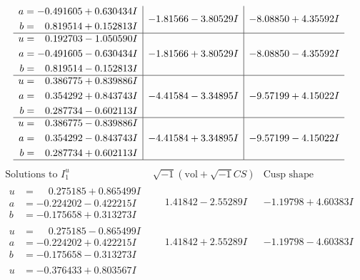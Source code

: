\documentclass[1p]{elsarticle_modified}
\theoremstyle{definition}
\newcommand{\I}{\sqrt{-1}}
\begin{document}
$$\begin{array}{c|c|c}
\begin{aligned}
a &= -0.491605 + 0.630434 I \\
b &= \phantom{-}0.819514 + 0.152813 I\end{aligned}
 & -1.81566 - 3.80529 I & -8.08850 + 4.35592 I \\ \hline\begin{aligned}
u &= \phantom{-}0.192703 - 1.050590 I \\
a &= -0.491605 - 0.630434 I \\
b &= \phantom{-}0.819514 - 0.152813 I\end{aligned}
 & -1.81566 + 3.80529 I & -8.08850 - 4.35592 I \\ \hline\begin{aligned}
u &= \phantom{-}0.386775 + 0.839886 I \\
a &= \phantom{-}0.354292 + 0.843743 I \\
b &= \phantom{-}0.287734 - 0.602113 I\end{aligned}
 & -4.41584 - 3.34895 I & -9.57199 + 4.15022 I \\ \hline\begin{aligned}
u &= \phantom{-}0.386775 - 0.839886 I \\
a &= \phantom{-}0.354292 - 0.843743 I \\
b &= \phantom{-}0.287734 + 0.602113 I\end{aligned}
 & -4.41584 + 3.34895 I & -9.57199 - 4.15022 I\\
 \hline 
 \end{array}$$\newpage$$\begin{array}{c|c|c}  
\text{Solutions to }I^u_{1}& \I (\text{vol} + \sqrt{-1}CS) & \text{Cusp shape}\\
 \hline 
\begin{aligned}
u &= \phantom{-}0.275185 + 0.865499 I \\
a &= -0.224202 - 0.422215 I \\
b &= -0.175658 + 0.313273 I\end{aligned}
 & \phantom{-}1.41842 - 2.55289 I & -1.19798 + 4.60383 I \\ \hline\begin{aligned}
u &= \phantom{-}0.275185 - 0.865499 I \\
a &= -0.224202 + 0.422215 I \\
b &= -0.175658 - 0.313273 I\end{aligned}
 & \phantom{-}1.41842 + 2.55289 I & -1.19798 - 4.60383 I \\ \hline\begin{aligned}
u &= -0.376433 + 0.803567 I \\

\end{aligned}
\end{array}$$
\end{document}
